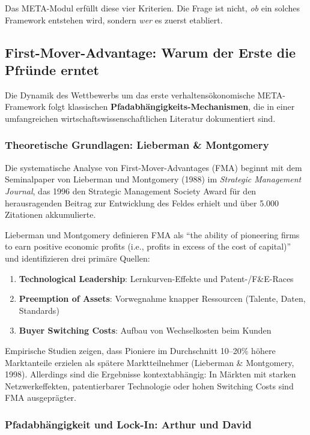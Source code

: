 Das \BCM{} META-Modul erfüllt diese vier Kriterien. Die Frage ist nicht, \textit{ob} ein solches Framework entstehen wird, sondern \textit{wer} es zuerst etabliert.

\subsection{First-Mover-Advantage: Warum der Erste die Pfründe erntet}

Die Dynamik des Wettbewerbs um das erste verhaltensökonomische META-Framework folgt klassischen \textbf{Pfadabhängigkeits-Mechanismen}, die in einer umfangreichen wirtschaftswissenschaftlichen Literatur dokumentiert sind.

\subsubsection{Theoretische Grundlagen: Lieberman \& Montgomery}

Die systematische Analyse von First-Mover-Advantages (FMA) beginnt mit dem Seminalpaper von Lieberman und Montgomery (1988) im \textit{Strategic Management Journal}, das 1996 den Strategic Management Society Award für den herausragenden Beitrag zur Entwicklung des Feldes erhielt und über 5.000 Zitationen akkumulierte.

Lieberman und Montgomery definieren FMA als ``the ability of pioneering firms to earn positive economic profits (i.e., profits in excess of the cost of capital)'' und identifizieren drei primäre Quellen:

\begin{enumerate}[label=(\arabic*)]
    \item \textbf{Technological Leadership}: Lernkurven-Effekte und Patent-/F\&E-Races
    \item \textbf{Preemption of Assets}: Vorwegnahme knapper Ressourcen (Talente, Daten, Standards)
    \item \textbf{Buyer Switching Costs}: Aufbau von Wechselkosten beim Kunden
\end{enumerate}

Empirische Studien zeigen, dass Pioniere im Durchschnitt 10--20\% höhere Marktanteile erzielen als spätere Marktteilnehmer (Lieberman \& Montgomery, 1998). Allerdings sind die Ergebnisse kontextabhängig: In Märkten mit starken Netzwerkeffekten, patentierbarer Technologie oder hohen Switching Costs sind FMA ausgeprägter.

\subsubsection{Pfadabhängigkeit und Lock-In: Arthur und David}


